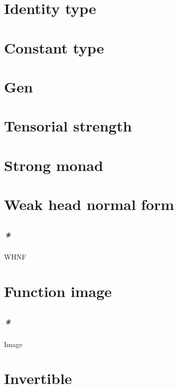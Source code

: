 \documentclass[a4paper,14pt,oneside]{book}
\begin{document}
\chapter{\label{orgc81d11e}Identity type}
\label{sec:org72ca983}

\chapter{\label{orgd91ff0f}Constant type}
\label{sec:org50fb3c4}

\chapter{\label{orgb98e9b5}Gen}
\label{sec:orgcc6870f}


\chapter{\label{orgfab2084}Tensorial strength}
\label{sec:org7d4e4d7}

\chapter{\label{orgee8b08d}Strong monad}
\label{sec:org99904fd}

\chapter{\label{orgd392f8b}Weak head normal form}
\label{sec:org11f0a96}

\section{\emph{*}}
\label{sec:orgddee728}

\label{orge00f3b8}WHNF\\

\chapter{\label{org2ca41a7}Function image}
\label{sec:orgef9cca3}

\section{\emph{*}}
\label{sec:orge1fcbf8}

\label{orgc34e368}Image\\

\chapter{\label{org9eb4989}Invertible}
\label{sec:org9e1a8e4}
\end{document}
